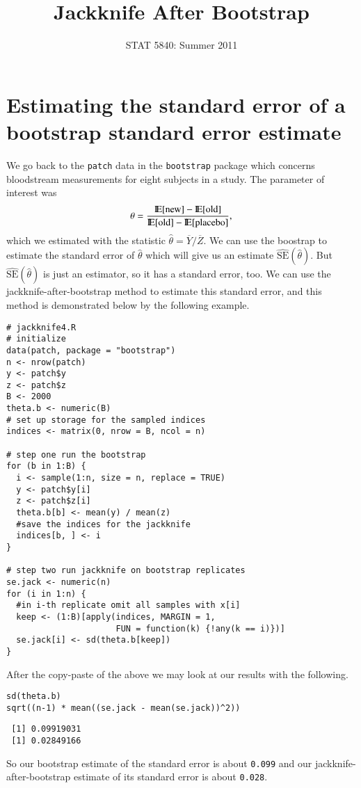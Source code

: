 \documentclass[11pt,english]{article}
\title{Jackknife After Bootstrap}
\date{STAT 5840: Summer 2011}
\begin{document}
\maketitle

\thispagestyle{empty}

\section*{Estimating the standard error of a bootstrap standard error estimate}
\label{sec-1}

We go back to the \texttt{patch} data in the \texttt{bootstrap} package which concerns bloodstream measurements for eight subjects in a study. The parameter of interest was
\[
\theta = \frac{\mathrm{I\hspace{-1.5pt}E}[\mathrm{new}] - \mathrm{I\hspace{-1.5pt}E}[\mathrm{old}]}{\mathrm{I\hspace{-1.5pt}E}[\mathrm{old}] - \mathrm{I\hspace{-1.5pt}E}[\mathrm{placebo}]},
\]
which we estimated with the statistic \(\hat{\theta} = \overline{Y}/\overline{Z}\).  We can use the boostrap to estimate the standard error of $\hat{\theta}$ which will give us an estimate $\widehat{\mathrm{SE}}(\hat{\theta})$.  But $\widehat{\mathrm{SE}}(\hat{\theta})$ is just an estimator, so it has a standard error, too.  We can use the jackknife-after-bootstrap method to estimate this standard error, and this method is demonstrated below by the following example.

\begin{verbatim}
# jackknife4.R
# initialize
data(patch, package = "bootstrap")
n <- nrow(patch)
y <- patch$y
z <- patch$z
B <- 2000
theta.b <- numeric(B)
# set up storage for the sampled indices
indices <- matrix(0, nrow = B, ncol = n)

# step one run the bootstrap
for (b in 1:B) {
  i <- sample(1:n, size = n, replace = TRUE)
  y <- patch$y[i]
  z <- patch$z[i]
  theta.b[b] <- mean(y) / mean(z)
  #save the indices for the jackknife
  indices[b, ] <- i
}

# step two run jackknife on bootstrap replicates
se.jack <- numeric(n)
for (i in 1:n) {
  #in i-th replicate omit all samples with x[i]
  keep <- (1:B)[apply(indices, MARGIN = 1,
                      FUN = function(k) {!any(k == i)})]
  se.jack[i] <- sd(theta.b[keep])
}
\end{verbatim}



After the copy-paste of the above we may look at our results with the following.
\begin{verbatim}
sd(theta.b)
sqrt((n-1) * mean((se.jack - mean(se.jack))^2))
\end{verbatim}

\begin{verbatim}
 [1] 0.09919031
 [1] 0.02849166
\end{verbatim}


So our bootstrap estimate of the standard error is about  \texttt{0.099} and our jackknife-after-bootstrap estimate of its standard error is about  \texttt{0.028}.
\end{document}
